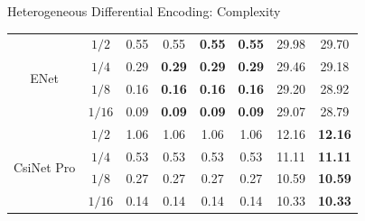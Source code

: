 \documentclass{beamer}
\begin{document}
{\begin{frame}{Heterogeneous Differential Encoding: Complexity}
{\begin{table}[htb]
\begin{tabular}{|cc|cccc|cc|}
    \multicolumn{1}{|c|}{\multirow{4}{*}{ENet}}       & $1/2$  & \multicolumn{1}{c|}{0.55}          & \multicolumn{1}{c|}{0.55}          & \multicolumn{1}{c|}{\textbf{0.55}} & \textbf{0.55} & \multicolumn{1}{c|}{29.98}         & 29.70          \\ \cline{2-8} 
    \multicolumn{1}{|c|}{}                            & $1/4$  & \multicolumn{1}{c|}{0.29}          & \multicolumn{1}{c|}{\textbf{0.29}} & \multicolumn{1}{c|}{\textbf{0.29}} & \textbf{0.29} & \multicolumn{1}{c|}{29.46}         & 29.18          \\ \cline{2-8} 
    \multicolumn{1}{|c|}{}                            & $1/8$  & \multicolumn{1}{c|}{0.16}          & \multicolumn{1}{c|}{\textbf{0.16}} & \multicolumn{1}{c|}{\textbf{0.16}} & \textbf{0.16} & \multicolumn{1}{c|}{29.20}         & 28.92          \\ \cline{2-8} 
    \multicolumn{1}{|c|}{}                            & $1/16$ & \multicolumn{1}{c|}{0.09}          & \multicolumn{1}{c|}{\textbf{0.09}} & \multicolumn{1}{c|}{\textbf{0.09}} & \textbf{0.09} & \multicolumn{1}{c|}{29.07}         & 28.79          \\ \hline
    \multicolumn{1}{|c|}{\multirow{4}{*}{CsiNet Pro}} & $1/2$  & \multicolumn{1}{c|}{1.06}          & \multicolumn{1}{c|}{1.06}          & \multicolumn{1}{c|}{1.06}          & 1.06          & \multicolumn{1}{c|}{12.16}         & \textbf{12.16} \\ \cline{2-8} 
    \multicolumn{1}{|c|}{}                            & $1/4$  & \multicolumn{1}{c|}{0.53}          & \multicolumn{1}{c|}{0.53}          & \multicolumn{1}{c|}{0.53}          & 0.53          & \multicolumn{1}{c|}{11.11}         & \textbf{11.11} \\ \cline{2-8} 
    \multicolumn{1}{|c|}{}                            & $1/8$  & \multicolumn{1}{c|}{0.27}          & \multicolumn{1}{c|}{0.27}          & \multicolumn{1}{c|}{0.27}          & 0.27          & \multicolumn{1}{c|}{10.59}         & \textbf{10.59} \\ \cline{2-8} 
    \multicolumn{1}{|c|}{}                            & $1/16$ & \multicolumn{1}{c|}{0.14}          & \multicolumn{1}{c|}{0.14}          & \multicolumn{1}{c|}{0.14}          & 0.14          & \multicolumn{1}{c|}{10.33}         & \textbf{10.33} \\ \hline
    \end{tabular}
    \end{table}
    }
  \end{frame}
  }
\end{document}
